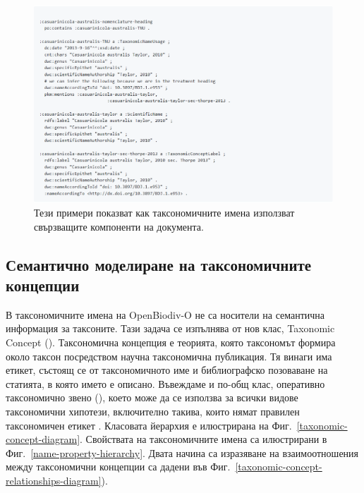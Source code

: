 \begin{figure}[h!]
\centering
  \includegraphics[width=\textwidth]{Figures/example-taxonomic-name-usage}
  \decoRule
  \caption[Example taxonomic name usage.]{
  Тези примери показват как таксономичните имена използват свързващите компоненти на документа.}
  \label{example-taxonomic-name-usage}
\end{figure}

\subsection{Семантично моделиране на таксономичните концепции}

В таксономичните имена на OpenBiodiv-O не са носители на семантична информация за таксоните. Тази задача се изпълнява от нов клас, Taxonomic Concept (). Таксономична концепция е теорията, която таксономът формира около таксон посредством научна таксономична публикация. Тя винаги има етикет, състоящ се от таксономичното име и библиографско позоваване на статията, в която името е описано. Въвеждаме и по-общ клас, оперативно таксономично звено (), което може да се използва за всички видове таксономични хипотези, включително такива, които нямат правилен таксономичен етикет . Класовата йерархия е илюстрирана на Фиг.~\ref{taxonomic-concept-diagram}. Свойствата на таксономичните имена са илюстрирани в Фиг.~\ref{name-property-hierarchy}.  Двата начина са изразяване на взаимоотношения между таксономични концепции са дадени във Фиг.~\ref{taxonomic-concept-relationships-diagram}).

